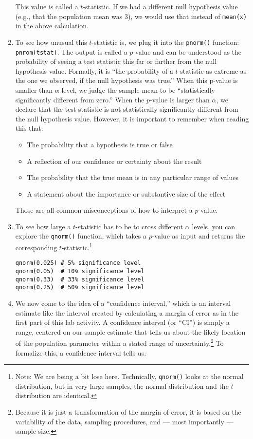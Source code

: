 \documentclass[a4paper,12pt]{article}
\begin{document}
\begin{enumerate}
\noindent This value is called a $t$-statistic. If we had a different null hypothesis value (e.g., that the population mean was 3), we would use that instead of \texttt{mean(x)} in the above calculation.

\item To see how unusual this $t$-statistic is, we plug it into the \texttt{pnorm()} function: \texttt{pnrom(tstat)}. The output is called a $p$-value and can be understood as the probability of seeing a test statistic this far or farther from the null hypothesis value. Formally, it is ``the probability of a $t$-statistic as extreme as the one we observed, if the null hypothesis was true.'' When this p-value is smaller than $\alpha$ level, we judge the sample mean to be ``statistically significantly different from zero.'' When the $p$-value is larger than $\alpha$, we declare that the test statistic is not statistically significantly different from the null hypothesis value. However, it is important to remember when reading this that:

\begin{itemize}
\item The probability that a hypothesis is true or false
\item A reflection of our confidence or certainty about the result
\item The probability that the true mean is in any particular range of values
\item A statement about the importance or substantive size of the effect
\end{itemize}

\noindent Those are all common misconceptions of how to interpret a $p$-value.

\item To see how large a $t$-statistic has to be to cross different $\alpha$ levels, you can explore the \texttt{qnorm()} function, which takes a $p$-value as input and returns the corresponding $t$-statistic.\footnote{Note: We are being a bit lose here. Technically, \texttt{qnorm()} looks at the normal distribution, but in very large samples, the normal distribution and the $t$ distribution are identical.}

\begin{verbatim}
qnorm(0.025) # 5% significance level
qnorm(0.05)  # 10% significance level
qnorm(0.33)  # 33% significance level
qnorm(0.25)  # 50% significance level
\end{verbatim}

\item We now come to the idea of a ``confidence interval,'' which is an interval estimate like the interval created by calculating a margin of error as in the first part of this lab activity. A confidence interval (or ``CI'') is simply a range, centered on our sample estimate that tells us about the likely location of the population parameter within a stated range of uncertainty.\footnote{Because it is just a transformation of the margin of error, it is based on the variability of the data, sampling procedures, and --- most importantly --- sample size.} To formalize this, a confidence interval tells us:


\end{enumerate}
\end{document}
